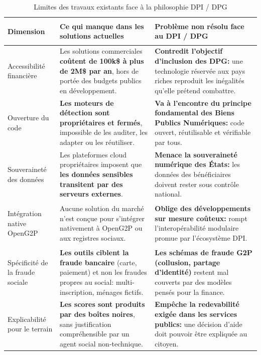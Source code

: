 \documentclass[a4paper, oneside, 12pt]{book}
\newcommand{\thead}[1]{\cellcolor{EYdark}\textcolor{white}{\textbf{#1}}}
\renewcommand{\thead}[1]{\cellcolor{EYyellow}\textcolor{EYdark}{\textbf{#1}}}
\begin{document}
\begin{table}[H]
\centering
\caption{Limites des travaux existants face à la philosophie DPI / DPG}
\label{tab:limites_existant}
\renewcommand{\arraystretch}{1.4}
\small
\begin{tabular}{|>{\columncolor{EYgray}\bfseries\raggedright\arraybackslash}p{3cm}|>{\raggedright\arraybackslash}p{6cm}|>{\raggedright\arraybackslash}p{6cm}|}
\hline
\thead{Dimension} & \thead{Ce qui manque dans les solutions actuelles} & \thead{Problème non résolu face au DPI / DPG} \\
\hline
 
Accessibilité financière 
& Les solutions commerciales \textbf{coûtent de 100k\$ à plus de 2M\$ par an}, hors de portée des budgets publics en développement. 
& \textbf{Contredit l'objectif d'inclusion des DPG:} une technologie réservée aux pays riches reproduit les inégalités qu'elle prétend combattre. \\
\hline
 
Ouverture du code 
& \textbf{Les moteurs de détection sont propriétaires et fermés}, impossible de les auditer, les adapter ou les réutiliser. 
& \textbf{Va à l'encontre du principe fondamental des Biens Publics Numériques:} code ouvert, réutilisable et vérifiable par tous. \\
\hline
 
Souveraineté des données 
& Les plateformes cloud propriétaires imposent que \textbf{les données sensibles transitent par des serveurs externes}. 
& \textbf{Menace la souveraineté numérique des États:} les données des bénéficiaires doivent rester sous contrôle national. \\
\hline
 
Intégration native OpenG2P 
& Aucune solution du marché n'est conçue pour s'intégrer nativement à OpenG2P ou aux registres sociaux. 
& \textbf{Oblige des développements sur mesure coûteux:} rompt l'interopérabilité modulaire promue par l'écosystème DPI. \\
\hline
 
Spécificité de la fraude sociale 
& \textbf{Les outils ciblent la fraude bancaire} (carte, paiement) et non les fraudes propres au social: multi-inscription, ménages fictifs.
& \textbf{Les schémas de fraude G2P (collusion, partage d'identité)} restent mal couverts par des modèles pensés pour la finance. \\
\hline
 
Explicabilité pour le terrain 
& \textbf{Les scores sont produits par des boîtes noires}, sans justification compréhensible par un agent social non-technique. 
& \textbf{Empêche la redevabilité exigée dans les services publics:} une décision d'aide doit pouvoir être expliquée au citoyen. \\
\hline
 

\end{tabular}
\end{table}
\end{document}
